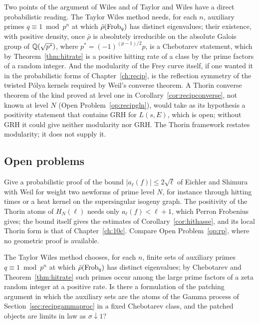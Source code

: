 Two points of the argument of Wiles and of Taylor and Wiles have a direct probabilistic reading. The Taylor Wiles method needs, for each $n$, auxiliary primes $q\equiv1\bmod p^n$ at which $\bar\rho(\operatorname{Frob}_q)$ has distinct eigenvalues; their existence, with positive density, once $\bar\rho$ is absolutely irreducible on the absolute Galois group of $\mathbb{Q}(\sqrt{p^*})$, where $p^*=(-1)^{(p-1)/2}p$, is a Chebotarev statement, which by Theorem~\ref{thm:hitrate} is a positive hitting rate of a class by the prime factors of a random integer. And the modularity of the Frey curve itself, if one wanted it in the probabilistic forms of Chapter~\ref{ch:recip}, is the reflection symmetry of the twisted P\'olya kernels required by Weil's converse theorem. A Thorin converse theorem of the kind proved at level one in Corollary~\ref{cor:recipconverse}, not known at level $N$ (Open Problem~\ref{op:recipgln}), would take as its hypothesis a positivity statement that contains GRH for $L(s,E)$, which is open; without GRH it could give neither modularity nor GRH. The Thorin framework restates modularity; it does not supply it.

\subsection{Open problems}

\begin{problem}\label{op:flthasse}
Give a probabilistic proof of the bound $|a_\ell(f)|\le2\sqrt\ell$ of Eichler and Shimura with Weil for weight two newforms of prime level $N$, for instance through hitting times or a heat kernel on the supersingular isogeny graph. The positivity of the Thorin atoms of $H_N(\ell)$ needs only $a_\ell(f)<\ell+1$, which Perron Frobenius gives; the bound itself gives the estimates of Corollary~\ref{cor:hithasse}, and its local Thorin form is that of Chapter~\ref{ch:10c}. Compare Open Problem~\ref{op:rp}, where no geometric proof is available.
\end{problem}

\begin{problem}\label{op:fltpatch}
The Taylor Wiles method chooses, for each $n$, finite sets of auxiliary primes $q\equiv1\bmod p^n$ at which $\bar\rho(\operatorname{Frob}_q)$ has distinct eigenvalues; by Chebotarev and Theorem~\ref{thm:hitrate} such primes occur among the large prime factors of a zeta random integer at a positive rate. Is there a formulation of the patching argument in which the auxiliary sets are the atoms of the Gamma process of Section~\ref{sec:recipgammaproc} in a fixed Chebotarev class, and the patched objects are limits in law as $\sigma\downarrow1$?
\end{problem}


